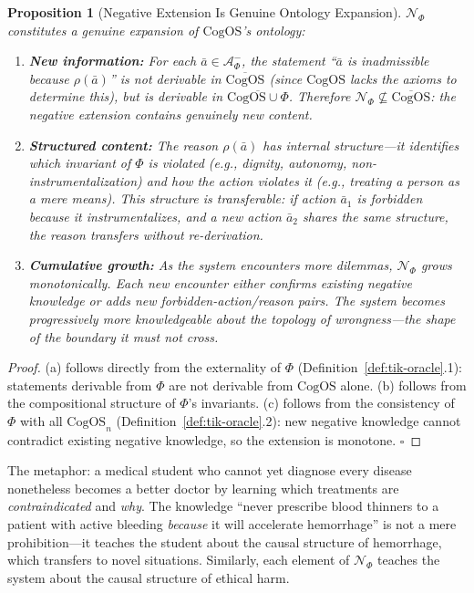 \documentclass[11pt]{article}
\newtheorem{proposition}{Proposition}
\newcommand{\CogOS}{\text{CogOS}}
\begin{document}
\begin{proposition}[Negative Extension Is Genuine Ontology Expansion]
\label{prop:neg-expansion}
$\mathcal{N}_\Phi$ constitutes a genuine expansion of $\CogOS$'s ontology:
\begin{enumerate}
\item[(a)] \textbf{New information:} For each $\bar{a} \in \mathcal{A}^-_\Phi$,
      the statement ``$\bar{a}$ is inadmissible because $\rho(\bar{a})$'' is
      not derivable in $\overline{\CogOS}$ (since $\CogOS$ lacks the axioms
      to determine this), but is derivable in $\overline{\CogOS \cup \Phi}$.
      Therefore $\mathcal{N}_\Phi \not\subseteq \overline{\CogOS}$: the
      negative extension contains genuinely new content.
\item[(b)] \textbf{Structured content:} The reason $\rho(\bar{a})$ has internal
      structure---it identifies \textit{which} invariant of $\Phi$ is violated
      (e.g., dignity, autonomy, non-instrumentalization) and \textit{how} the
      action violates it (e.g., treating a person as a mere means). This
      structure is transferable: if action $\bar{a}_1$ is forbidden because it
      instrumentalizes, and a new action $\bar{a}_2$ shares the same structure,
      the reason transfers without re-derivation.
\item[(c)] \textbf{Cumulative growth:} As the system encounters more dilemmas,
      $\mathcal{N}_\Phi$ grows monotonically. Each new encounter either
      confirms existing negative knowledge or adds new forbidden-action/reason
      pairs. The system becomes progressively more knowledgeable about the
      \textit{topology of wrongness}---the shape of the boundary it must not
      cross.
\end{enumerate}
\end{proposition}

\begin{proof}
(a) follows directly from the externality of $\Phi$
(Definition~\ref{def:tik-oracle}.1): statements derivable from $\Phi$ are not
derivable from $\CogOS$ alone. (b) follows from the compositional structure of
$\Phi$'s invariants. (c) follows from the consistency of $\Phi$ with all
$\CogOS_n$ (Definition~\ref{def:tik-oracle}.2): new negative knowledge cannot
contradict existing negative knowledge, so the extension is monotone.
\hfill $\square$
\end{proof}

\noindent The metaphor: a medical student who cannot yet diagnose every
disease nonetheless becomes a better doctor by learning which treatments are
\textit{contraindicated} and \textit{why}. The knowledge ``never prescribe
blood thinners to a patient with active bleeding \textit{because} it will
accelerate hemorrhage'' is not a mere prohibition---it teaches the student
about the causal structure of hemorrhage, which transfers to novel situations.
Similarly, each element of $\mathcal{N}_\Phi$ teaches the system about the
causal structure of ethical harm.
\end{document}
